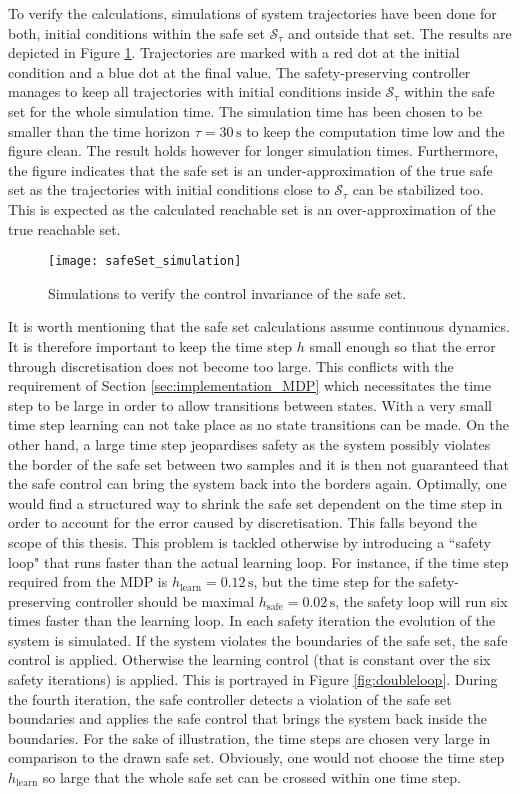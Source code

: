 \documentclass[../main.tex]{subfiles}
\begin{document}
To verify the calculations, simulations of system trajectories have been done for both, initial conditions within the safe set $\mathcal{S}_\tau$ and outside that set. The results are depicted in Figure \ref{fig:safeSet_simulation}. Trajectories are marked with a red dot at the initial condition and a blue dot at the final value. The safety-preserving controller manages to keep all trajectories with initial conditions inside $\mathcal{S}_\tau$ within the safe set for the whole simulation time. The simulation time has been chosen to be smaller than the time horizon $\tau = 30 \,\text{s}$ to keep the computation time low and the figure clean. The result holds however for longer simulation times. Furthermore, the figure indicates that the safe set is an under-approximation of the true safe set as the trajectories with initial conditions close to $\mathcal{S}_\tau$ can be stabilized too. This is expected as the calculated reachable set is an over-approximation of the true reachable set. \par
\begin{figure}[h]
    \centering
    \texttt{[image: safeSet\_simulation]}
        \caption{Simulations to verify the control invariance of the safe set.}    
    \label{fig:safeSet_simulation}
\end{figure}
It is worth mentioning that the safe set calculations assume continuous dynamics. It is therefore important to keep the time step $h$ small enough so that the error through discretisation does not become too large. This conflicts with the requirement of Section \ref{sec:implementation_MDP} which necessitates the time step to be large in order to allow transitions between states. With a very small time step learning can not take place as no state transitions can be made. On the other hand, a large time step jeopardises safety as the system possibly violates the border of the safe set between two samples and it is then not guaranteed that the safe control can bring the system back into the borders again. Optimally, one would find a structured way to shrink the safe set dependent on the time step in order to account for the error caused by discretisation. This falls beyond the scope of this thesis. This problem is tackled otherwise by introducing a ``safety loop" that runs faster than the actual learning loop. For instance, if the time step required from the MDP is $h_{\text{learn}} = 0.12\,\text{s}$, but the time step for the safety-preserving controller should be maximal $h_{\text{safe}} = 0.02\,\text{s}$, the safety loop will run six times faster than the learning loop. In each safety iteration the evolution of the system is simulated. If the system violates the boundaries of the safe set, the safe control is applied. Otherwise the learning control (that is constant over the six safety iterations) is applied. This is portrayed in Figure \ref{fig:doubleloop}. During the fourth iteration, the safe controller detects a violation of the safe set boundaries and applies the safe control that brings the system back inside the boundaries. For the sake of illustration, the time steps are chosen very large in comparison to the drawn safe set. Obviously, one would not choose the time step $h_{\text{learn}}$ so large that the whole safe set can be crossed within one time step.
\end{document}
